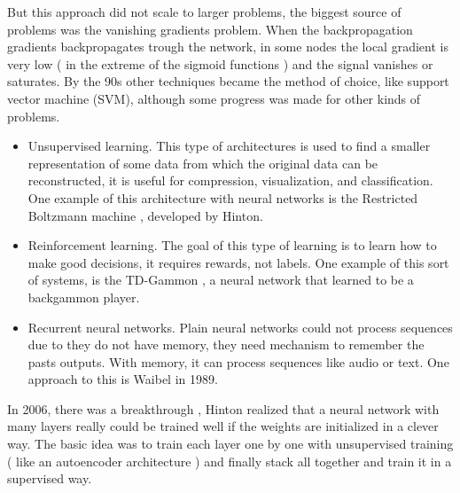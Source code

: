 But this approach did not scale to larger problems, the biggest source of problems was the vanishing gradients problem. When the backpropagation gradients backpropagates trough the network, in some nodes the local gradient is very low ( in the extreme of the sigmoid functions ) and the signal vanishes or saturates. By the 90s other techniques became the method of choice, like support vector machine (SVM), although some progress was made for other kinds of problems.

\begin{itemize}

\item Unsupervised learning. This type of architectures is used to find a smaller representation of some data from which the original data can be reconstructed, it is useful for compression, visualization, and classification. One example of this architecture with neural networks is the Restricted Boltzmann machine \cite{boltzmann}, developed by Hinton.
 
\item Reinforcement learning. The goal of this type of learning is to learn how to make good decisions, it requires rewards, not labels. One example of this sort of systems, is the TD-Gammon \cite{Gammon}, a neural network that learned to be a backgammon player.


\item Recurrent neural networks. Plain neural networks could not process sequences due to they do not have memory, they need mechanism to remember the pasts outputs. With memory, it can process sequences like audio or text. One approach to this is Waibel \cite{Waibel} in 1989. 


\end{itemize}


In 2006, there was a breakthrough \cite{hinton06}, Hinton realized that a neural network with many layers really could be trained well if the weights are initialized in a clever way. The basic idea was to train each layer one by one with unsupervised training ( like an autoencoder architecture ) and finally stack all together and train it in a supervised way. 

